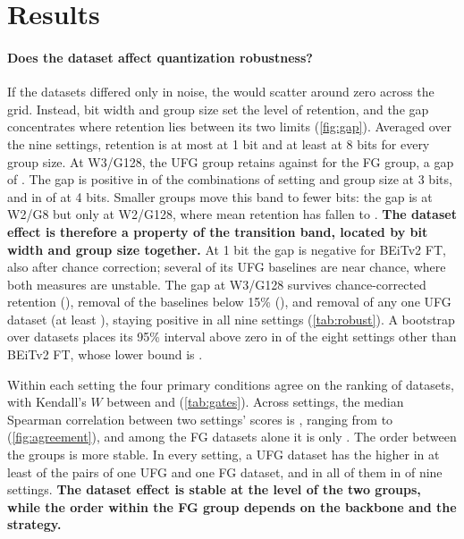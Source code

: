 \section{Results}
\label{sec:results}

\paragraph{Does the dataset affect quantization robustness?}
If the datasets differed only in noise, the  would scatter around zero across the grid.
Instead, bit width and group size set the level of retention, and the gap concentrates where retention lies between its two limits (\cref{fig:gap}).
Averaged over the nine settings, retention is at most  at 1 bit and at least  at 8 bits for every group size.
At W3/G128, the UFG group retains  against  for the FG group, a gap of .
The gap is positive in  of the  combinations of setting and group size at 3 bits, and in  of  at 4 bits.
Smaller groups move this band to fewer bits: the gap is  at W2/G8 but only  at W2/G128, where mean retention has fallen to .
\textbf{The dataset effect is therefore a property of the transition band, located by bit width and group size together.}
At 1 bit the gap is negative for BEiTv2 FT, also after chance correction; several of its UFG baselines are near chance, where both measures are unstable.
The gap at W3/G128 survives chance-corrected retention (), removal of the  baselines below 15\% (), and removal of any one UFG dataset (at least ), staying positive in all nine settings (\cref{tab:robust}).
A bootstrap over datasets places its 95\% interval above zero in  of the eight settings other than BEiTv2 FT, whose lower bound is .

Within each setting the four primary conditions agree on the ranking of datasets, with Kendall's $W$ between  and  (\cref{tab:gates}).
Across settings, the median Spearman correlation between two settings' scores is , ranging from  to  (\cref{fig:agreement}), and among the FG datasets alone it is only .
The order between the groups is more stable.
In every setting, a UFG dataset has the higher  in at least  of the pairs of one UFG and one FG dataset, and in all of them in  of nine settings.
\textbf{The dataset effect is stable at the level of the two groups, while the order within the FG group depends on the backbone and the strategy.}

